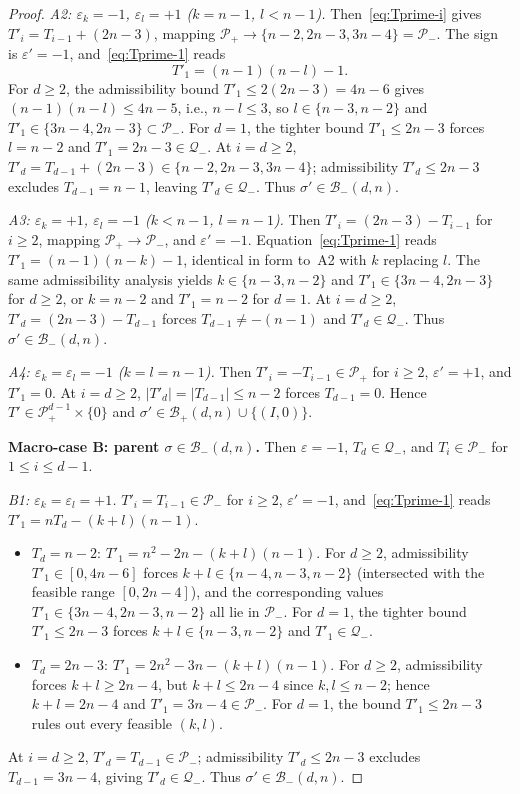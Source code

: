 \documentclass{amsart}
\theoremstyle{definition}
\theoremstyle{remark}
\begin{document}
\begin{proof}
\emph{A2: $\varepsilon_k = -1$, $\varepsilon_l = +1$ ($k = n-1$,
$l < n-1$).}
Then~\eqref{eq:Tprime-i} gives $T'_i = T_{i-1} + (2n-3)$, mapping
$\mathcal{P}_+ \to \{n-2, 2n-3, 3n-4\} = \mathcal{P}_-$.  The
sign is $\varepsilon' = -1$, and~\eqref{eq:Tprime-1} reads
\[
  T'_1 = (n-1)(n - l) - 1.
\]
For $d \ge 2$, the admissibility bound $T'_1 \le 2(2n-3) = 4n-6$
gives $(n-1)(n-l) \le 4n-5$, i.e., $n - l \le 3$, so
$l \in \{n-3, n-2\}$ and $T'_1 \in \{3n-4, 2n-3\} \subset \mathcal{P}_-$.
For $d = 1$, the tighter bound $T'_1 \le 2n-3$ forces $l = n-2$
and $T'_1 = 2n-3 \in \mathcal{Q}_-$.
At $i = d \ge 2$, $T'_d = T_{d-1} + (2n-3) \in \{n-2, 2n-3, 3n-4\}$;
admissibility $T'_d \le 2n-3$ excludes $T_{d-1} = n-1$, leaving
$T'_d \in \mathcal{Q}_-$.  Thus $\sigma' \in \mathcal{B}_-(d, n)$.

\emph{A3: $\varepsilon_k = +1$, $\varepsilon_l = -1$ ($k < n-1$,
$l = n-1$).}
Then $T'_i = (2n-3) - T_{i-1}$ for $i \ge 2$, mapping $\mathcal{P}_+ \to
\mathcal{P}_-$, and $\varepsilon' = -1$.  Equation~\eqref{eq:Tprime-1}
reads $T'_1 = (n-1)(n-k) - 1$, identical in form to~A2 with $k$ replacing $l$.
The same admissibility analysis yields $k \in \{n-3, n-2\}$ and
$T'_1 \in \{3n-4, 2n-3\}$ for $d \ge 2$, or $k = n-2$ and
$T'_1 = n - 2$ for $d = 1$.  At $i = d \ge 2$, $T'_d = (2n-3) - T_{d-1}$
forces $T_{d-1} \neq -(n-1)$ and $T'_d \in \mathcal{Q}_-$.  Thus
$\sigma' \in \mathcal{B}_-(d, n)$.

\emph{A4: $\varepsilon_k = \varepsilon_l = -1$ ($k = l = n-1$).}
Then $T'_i = -T_{i-1} \in \mathcal{P}_+$ for $i \ge 2$, $\varepsilon' = +1$,
and $T'_1 = 0$.  At $i = d \ge 2$, $|T'_d| = |T_{d-1}| \le n-2$ forces
$T_{d-1} = 0$.  Hence $T' \in \mathcal{P}_+^{d-1} \times \{0\}$ and
$\sigma' \in \mathcal{B}_+(d, n) \cup \{(I, 0)\}$.

\smallskip\noindent\textbf{Macro-case B: parent
$\sigma \in \mathcal{B}_-(d, n)$.}
Then $\varepsilon = -1$, $T_d \in \mathcal{Q}_-$, and
$T_i \in \mathcal{P}_-$ for $1 \le i \le d-1$.

\emph{B1: $\varepsilon_k = \varepsilon_l = +1$.}
$T'_i = T_{i-1} \in \mathcal{P}_-$ for $i \ge 2$, $\varepsilon' = -1$,
and~\eqref{eq:Tprime-1} reads $T'_1 = n T_d - (k+l)(n-1)$.
\begin{itemize}
\item $T_d = n - 2$: $T'_1 = n^2 - 2n - (k+l)(n-1)$.  For $d \ge 2$,
admissibility $T'_1 \in [0, 4n-6]$ forces $k + l \in \{n-4, n-3, n-2\}$
(intersected with the feasible range $[0, 2n-4]$), and the
corresponding values $T'_1 \in \{3n-4, 2n-3, n-2\}$ all lie in
$\mathcal{P}_-$.  For $d = 1$, the tighter bound $T'_1 \le 2n-3$
forces $k+l \in \{n-3, n-2\}$ and $T'_1 \in \mathcal{Q}_-$.
\item $T_d = 2n - 3$: $T'_1 = 2n^2 - 3n - (k+l)(n-1)$.  For $d \ge 2$,
admissibility forces $k + l \ge 2n - 4$, but $k + l \le 2n - 4$ since
$k, l \le n-2$; hence $k + l = 2n - 4$ and $T'_1 = 3n - 4 \in \mathcal{P}_-$.
For $d = 1$, the bound $T'_1 \le 2n-3$ rules out every feasible $(k, l)$.
\end{itemize}
At $i = d \ge 2$, $T'_d = T_{d-1} \in \mathcal{P}_-$; admissibility
$T'_d \le 2n - 3$ excludes $T_{d-1} = 3n - 4$, giving
$T'_d \in \mathcal{Q}_-$.  Thus $\sigma' \in \mathcal{B}_-(d, n)$.


\end{proof}
\end{document}

